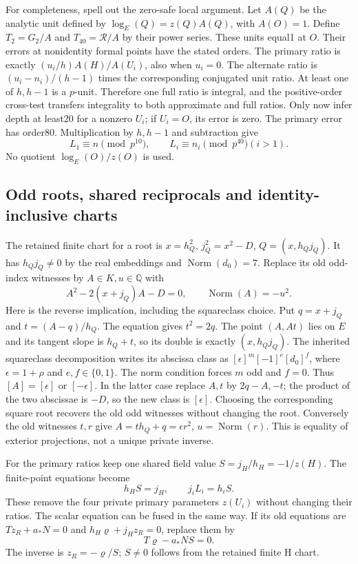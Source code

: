 For completeness, spell out the zero-safe local argument. Let $A(Q)$ be
the analytic unit defined by $\log_E(Q)=z(Q)A(Q)$, with $A(O)=1$.
Define $T_2=G_2/A$ and $T_{40}=\mathcal R/A$ by their power series.
These units equal1 at $O$. Their errors at nonidentity formal points
have the stated orders. The primary ratio is exactly
$(u_i/h)A(H)/A(U_i)$, also when $u_i=0$. The alternate ratio is
$(u_i-n_i)/(h-1)$ times the corresponding conjugated unit ratio.
At least one of $h,h-1$ is a $p$-unit. Therefore one full ratio is
integral, and the positive-order cross-test transfers integrality to
both approximate and full ratios. Only now infer depth at least20 for
a nonzero $U_i$; if $U_i=O$, its error is zero. The primary error has
order80. Multiplication by $h,h-1$ and subtraction give
\[
 L_1\equiv n\pmod{p^{10}},\qquad L_i\equiv n_i\pmod{p^{40}} (i>1).
\]
No quotient $\log_E(O)/z(O)$ is used.

\subsection{Odd roots, shared reciprocals and identity-inclusive charts}
The retained finite chart for a root is
$x=h_Q^2$, $j_Q^2=x^2-D$, $Q=(x,h_Qj_Q)$.
It has $h_Qj_Q\ne0$ by the real embeddings and $\operatorname{Norm}(d_0)=7$.
Replace its old odd-index witnesses by $A\in K,u\in\mathbb Q$ with
\[
 A^2-2(x+j_Q)A-D=0,\qquad \operatorname{Norm}(A)=-u^2.
\]
Here is the reverse implication, including the squareclass choice.
Put $q=x+j_Q$ and $t=(A-q)/h_Q$. The equation gives
$t^2=2q$. The point $(A,At)$ lies on $E$ and its tangent slope is
$h_Q+t$, so its double is exactly $(x,h_Qj_Q)$.
The inherited squareclass decomposition writes its abscissa class as
$[\epsilon]^m[-1]^e[d_0]^f$, where $\epsilon=1+\rho$ and $e,f\in\{0,1\}$.
The norm condition forces $m$ odd and $f=0$. Thus $[A]=[\epsilon]$
or $[-\epsilon]$. In the latter case replace $A,t$ by $2q-A,-t$;
the product of the two abscissae is $-D$, so the new class is
$[\epsilon]$. Choosing the corresponding square root recovers the old
odd witnesses without changing the root. Conversely the old witnesses
$t,r$ give $A=th_Q+q=\epsilon r^2$, $u=\operatorname{Norm}(r)$.
This is equality of exterior projections, not a unique private inverse.

For the primary ratios keep one shared field value
$S=j_H/h_H=-1/z(H)$. The finite-point equations become
\[
 h_H S=j_H,\qquad j_iL_i=h_iS.
\]
These remove the four private primary parameters $z(U_i)$ without
changing their ratios. The scalar equation can be fused in the same way.
If its old equations are $Tz_R+a_*N=0$ and
$h_H\varrho+j_Hz_R=0$, replace them by
\[
 T\varrho-a_*NS=0.
\]
The inverse is $z_R=-\varrho/S$; $S\ne0$ follows from the retained
finite H chart.

